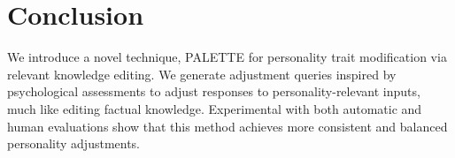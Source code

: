 \section{Conclusion}

We introduce a novel technique, PALETTE for personality trait modification via relevant knowledge editing. We generate adjustment queries inspired by psychological assessments to adjust responses to personality-relevant inputs, much like editing factual knowledge.
Experimental with both automatic and human evaluations show that this method achieves more consistent and balanced personality adjustments.

